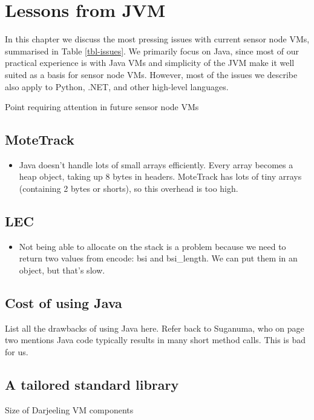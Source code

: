 \chapter{Lessons from JVM}
In this chapter we discuss the most pressing issues with current sensor node VMs, summarised in Table \ref{tbl-issues}. We primarily focus on Java, since most of our practical experience is with Java VMs and simplicity of the JVM make it well suited as a basis for sensor node VMs. However, most of the issues we describe also apply to Python, .NET, and other high-level languages.

\begin{table*}
    \centering
    \caption{Point requiring attention in future sensor node VMs}
    \scriptsize
    \label{tbl-issues}
    
\end{table*}


\section{MoteTrack}
\begin{itemize}
	\item Java doesn't handle lots of small arrays efficiently. Every array becomes a heap object, taking up 8 bytes in headers. MoteTrack has lots of tiny arrays (containing 2 bytes or shorts), so this overhead is too high.
\end{itemize}

\section{LEC}
\begin{itemize}
	\item Not being able to allocate on the stack is a problem because we need to return two values from encode: bsi and bsi\_length. We can put them in an object, but that's slow.
\end{itemize}

\section{Cost of using Java}
List all the drawbacks of using Java here.
Refer back to Suganuma, who on page two mentions Java code typically results in many short method calls. This is bad for us.

\section{A tailored standard library}
\label{sec-std-lib}
\begin{table*}
    \centering
    \caption{Size of Darjeeling VM components}
    \scriptsize
    \label{tab-vm-size}
     
\end{table*}

